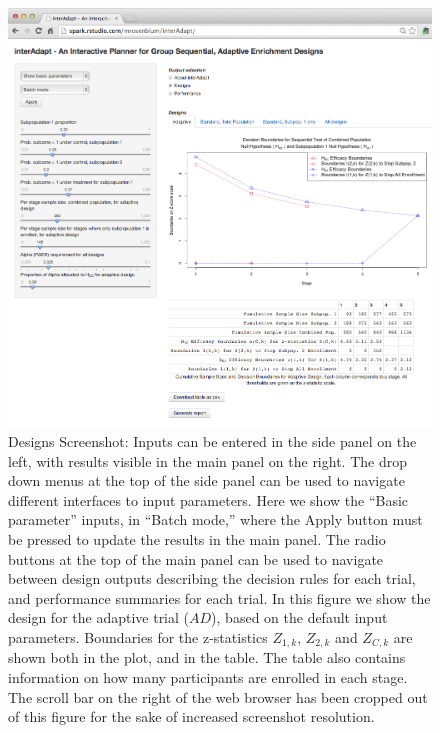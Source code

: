 \documentclass[article]{jss}
\begin{document}
\begin{figure}[h]
\centering{}\includegraphics[width=1\textwidth]{2014-02-29_screenshot_designs.png} 
\caption{Designs Screenshot: Inputs can be entered in the side panel on the left, with results visible in the main panel on the right. The drop down menus at the top of the side panel can be used to navigate different interfaces to input parameters. Here we show the ``Basic parameter'' inputs, in ``Batch mode,'' where the Apply button must be pressed to update the results in the main panel. The radio buttons at the top of the main panel can be used to navigate between design outputs describing the decision rules for each trial, and performance summaries for each trial. In this figure we show the design for the adaptive trial ($AD$), based on the default input parameters. Boundaries for the z-statistics $Z_{1,k}$, $Z_{2,k}$ and $Z_{C,k}$ are shown both in the plot, and in the table. The table also contains information on how many participants are enrolled in each stage. The scroll bar on the right of the web browser has been cropped out of this figure for the sake of increased screenshot resolution.  \label{fig:designs} }
\end{figure}%
\end{document}
